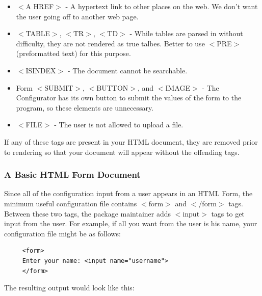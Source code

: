 \begin{itemize}
\item $<$A HREF$>$ - A hypertext link to other places on the web. We don't want
the user going off to another web page.
\item $<$TABLE$>$, $<$TR$>$, $<$TD$>$ - While tables are parsed in without difficulty,
they are not rendered as true talbes. Better to use $<$PRE$>$ (preformatted
text) for this purpose.
\item $<$ISINDEX$>$ - The document cannot be searchable.
\item Form $<$SUBMIT$>$, $<$BUTTON$>$, and $<$IMAGE$>$ - The Configurator has its own
button to submit the values of the form to the program, so these elements
are unnecessary.
\item $<$FILE$>$ - The user is not allowed to upload a file. 
\end{itemize}
If any of these tags are present in your HTML document, they are removed
prior to rendering so that your document will appear without the offending
tags.


\subsubsection*{A Basic HTML Form Document}

Since all of the configuration input from a user appears in an HTML
Form, the minimum useful configuration file contains $<$form$>$ and
$<$/form$>$
tags. Between these two tags, the package maintainer adds $<$input$>$
tags to get input from the user. For example, if all you want from
the user is his name, your configuration file might be as follows:

\begin{footnotesize}
\begin{verbatim}
     <form>
     Enter your name: <input name="username">
     </form>
\end{verbatim}
\end{footnotesize}

The resulting output would look like this:



~

